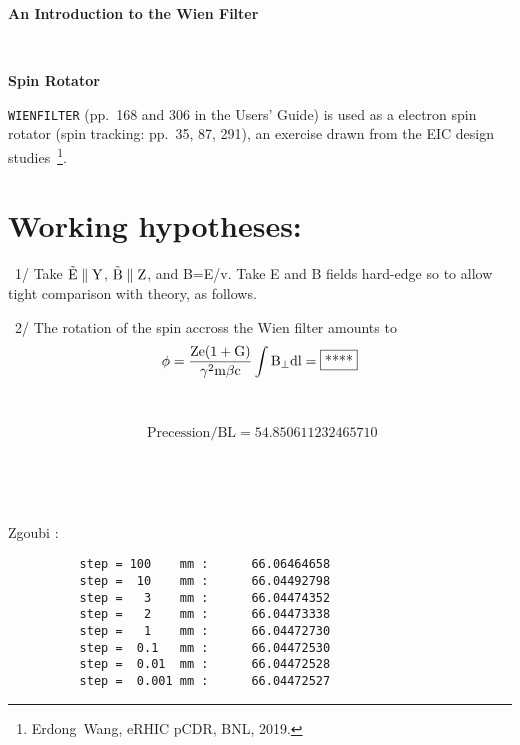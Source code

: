 \documentclass[10pt]{article}
\newcommand{\nin}{\noindent~}
\begin{document}
\thispagestyle{empty}

\begin{minipage}{1.\linewidth}
\bf
\vspace{-2ex}
  
\vspace{-2ex}
  
\vspace{-2ex}
  
\end{minipage}


\vspace{5ex}

\centerline{\LARGE \bf
  An Introduction to the Wien Filter  
}

~

\centerline{\LARGE \bf
Spin Rotator
}

\vspace{5ex}
\author{
F.~M\'eot
\\
Collider-Accelerator Department, BNL, Upton, NY 11973 \\
}



\texttt{WIENFILTER} (pp.~168 and 306 in the Users' Guide) is used as a
electron spin rotator (spin tracking: pp.~35, 87, 291), an exercise drawn from the EIC design studies~\footnote{Erdong~Wang, eRHIC pCDR, BNL, 2019.}.




\section*{Working hypotheses:}

\nin 1/ Take $\rm \vec E \parallel Y$, $\rm \vec B \parallel Z $, and B=E/v. 
Take E and B fields hard-edge so to allow tight comparison with theory, as follows.

\nin 2/ The rotation of the spin accross the Wien filter  amounts to
$$\rm \phi = \frac{Ze(1+G)}{\gamma^2 m \beta c } \int B_{\bot} dl = \fbox{****}$$

~

$$ \textrm{ Precession/BL} =     54.850611232465710$$     
         

~

~

  Zgoubi :
\begin{verbatim}
          step = 100    mm :      66.06464658
          step =  10    mm :      66.04492798
          step =   3    mm :      66.04474352
          step =   2    mm :      66.04473338
          step =   1    mm :      66.04472730
          step =  0.1   mm :      66.04472530
          step =  0.01  mm :      66.04472528
          step =  0.001 mm :      66.04472527
\end{verbatim}
\end{document}
